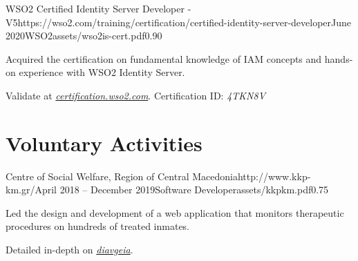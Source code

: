 \documentclass{mycv}
\begin{document}
	\vspace{0.5cm}

	\begin{EntryDatedLogo}{WSO2 Certified Identity Server Developer - V5}{https://wso2.com/training/certification/certified-identity-server-developer}{June 2020}{WSO2}{assets/wso2is-cert.pdf}{0.90}
		\begin{Itemize}
			\item Acquired the certification on fundamental knowledge of IAM concepts and hands-on experience with WSO2 Identity Server.
		\end{Itemize}
		\vspace{-0.3cm}
		Validate at \href{https://certification.wso2.com}{\textit{certification.wso2.com}}. Certification ID: \textit{4TKN8V}
	\end{EntryDatedLogo}

	\section{Voluntary Activities}
	\begin{EntryDatedLogo}{Centre of Social Welfare, Region of Central Macedonia}{http://www.kkp-km.gr/}{April 2018 -- December 2019}{Software Developer}{assets/kkpkm.pdf}{0.75}
		\begin{Itemize}
			\item Led the design and development of a web application that monitors therapeutic procedures on hundreds of treated inmates.
		\end{Itemize}
		\vspace{-0.3cm}
		Detailed in-depth on \href{https://diavgeia.gov.gr/decision/view/\%CE\%A8\%CE\%A6\%CE\%A1\%CE\%93\%CE\%9F\%CE\%9E\%CE\%A7\%CE\%A3-\%CE\%A0\%CE\%93\%CE\%A6}{\textit{diavgeia}}.
	\end{EntryDatedLogo}
\end{document}
